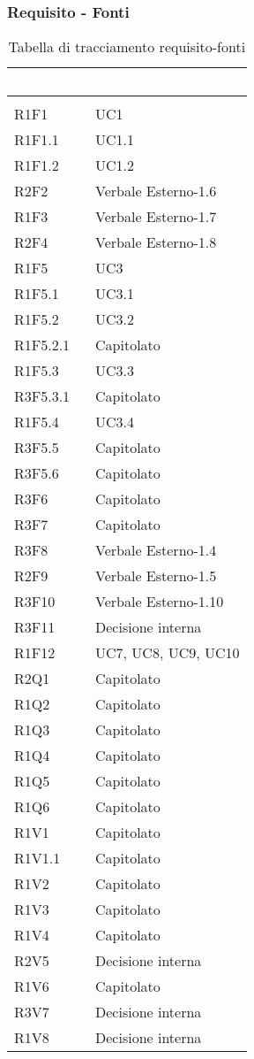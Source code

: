 \subsubsection{Requisito - Fonti}
\renewcommand{\arraystretch}{1.5}
\begin{center}
\begin{longtable}{C{6cm} C{6cm}}
		\textcolor{white}{\textbf{Requisito}} & 
		\textcolor{white}{\textbf{Fonti}}\\
		\endfirsthead
	    \\
	    \endfoot
	    \caption{Tabella di tracciamento requisito-fonti}
	    \endlastfoot


R1F1 & UC1 \\
R1F1.1 & UC1.1 \\
R1F1.2 & UC1.2 \\
R2F2 & Verbale Esterno-1.6 \\
R1F3 & Verbale Esterno-1.7 \\
R2F4 & Verbale Esterno-1.8 \\
R1F5 & UC3 \\
R1F5.1 & UC3.1 \\
R1F5.2 & UC3.2 \\
R1F5.2.1 & Capitolato \\
R1F5.3 & UC3.3 \\
R3F5.3.1 & Capitolato \\
R1F5.4 & UC3.4 \\
R3F5.5 & Capitolato \\
R3F5.6 & Capitolato \\
R3F6 & Capitolato \\
R3F7 & Capitolato \\
R3F8 & Verbale Esterno-1.4 \\
R2F9 & Verbale Esterno-1.5 \\
R3F10 & Verbale Esterno-1.10 \\
R3F11 & Decisione interna \\
R1F12 & UC7, UC8, UC9, UC10 \\
R2Q1 & Capitolato \\
R1Q2 & Capitolato \\
R1Q3 & Capitolato \\
R1Q4 & Capitolato \\
R1Q5 & Capitolato \\
R1Q6 & Capitolato \\
R1V1 & Capitolato \\
R1V1.1 & Capitolato \\
R1V2 & Capitolato \\
R1V3 & Capitolato \\
R1V4 & Capitolato \\
R2V5 & Decisione interna \\
R1V6 & Capitolato \\
R3V7 & Decisione interna \\
R1V8 & Decisione interna \\

\end{longtable}
\end{center}